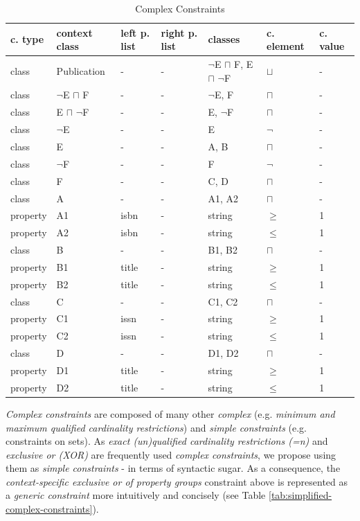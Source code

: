 \documentclass[a4paper,fontsize=11pt]{scrartcl}
\begin{document}
\begin{table}
  \scriptsize
  \sffamily
  \vspace{0cm}
	\caption{Complex Constraints}
	\label{tab:complex-constraints}
	\centering
		\begin{tabular}{l|l|l|l|l|l|l}
      \textbf{c. type} & \textbf{context class} & \textbf{left p. list} & \textbf{right p. list} & \textbf{classes} & \textbf{c. element} & \textbf{c. value} \\
      \hline
class & Publication & - & - & $\neg$E $\sqcap$ F, E $\sqcap$ $\neg$F & $\sqcup$ & - \\
class & $\neg$E $\sqcap$ F & - & - & $\neg$E, F & $\sqcap$ & - \\
class & E $\sqcap$ $\neg$F & - & - & E, $\neg$F & $\sqcap$ & - \\
class & $\neg$E & - & - & E & $\neg$ & - \\
class & E & - & - & A, B & $\sqcap$ & - \\
class & $\neg$F & - & - & F & $\neg$ & - \\
class & F & - & - & C, D & $\sqcap$ & - \\
class & A & - & - & A1, A2 & $\sqcap$ & - \\
property & A1 & isbn & - & string & $\geq$ & 1 \\
property & A2 & isbn & - & string & $\leq$ & 1 \\
class & B & - & - & B1, B2 & $\sqcap$ & - \\
property & B1 & title & - & string & $\geq$ & 1 \\
property & B2 & title & - & string & $\leq$ & 1 \\
class & C & - & - & C1, C2 & $\sqcap$ & - \\
property & C1 & issn & - & string & $\geq$ & 1 \\
property & C2 & issn & - & string & $\leq$ & 1 \\
class & D & - & - & D1, D2 & $\sqcap$ & - \\
property & D1 & title & - & string & $\geq$ & 1 \\
property & D2 & title & - & string & $\leq$ & 1 \\
		\end{tabular}
\end{table}

\emph{Complex constraints} are composed of many other \emph{complex} (e.g. \emph{minimum and maximum qualified cardinality restrictions}) and \emph{simple constraints} (e.g. constraints on sets).
As \emph{exact (un)qualified cardinality restrictions (=n)} and \emph{exclusive or (XOR)} are frequently used \emph{complex constraints},
we propose using them as \emph{simple constraints} - in terms of syntactic sugar.
As a consequence, the \emph{context-specific exclusive or of property groups} constraint above is represented as a \emph{generic constraint} more intuitively and concisely (see Table \ref{tab:simplified-complex-constraints}).
\end{document}
